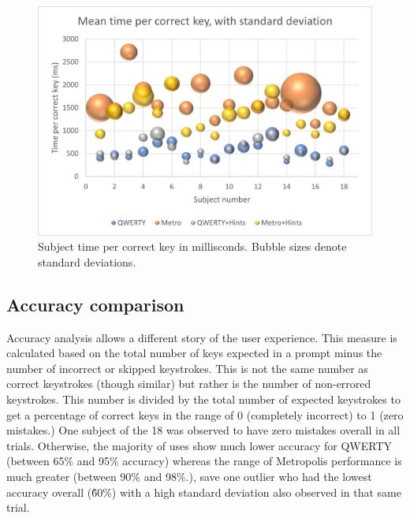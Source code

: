 \documentclass[english]{vgtc}
\begin{document}
\begin{figure}
  \centering
  \includegraphics[width=0.95\columnwidth]{time-per-key.png}
  \caption{Subject time per correct key in millisconds. Bubble sizes denote standard deviations.}
  \label{fig:keytime}
\end{figure}

\subsection{Accuracy comparison}

Accuracy analysis allows a different story of the user experience.  This measure is calculated based on the total number of keys expected in a prompt minus the number of incorrect or skipped keystrokes. This is not the same number as correct keystrokes (though similar) but rather is the number of non-errored keystrokes. This number is divided by the total number of expected keystrokes to get a percentage of correct keys in the range of 0 (completely incorrect) to 1 (zero mistakes.)  One subject of the 18 was observed to have zero mistakes overall in all trials.  Otherwise, the majority of uses show much lower accuracy for QWERTY (between 65\% and 95\% accuracy)
whereas the range of Metropolis performance is much greater (between 90\% and 98\%.), save one outlier who had the lowest accuracy overall (\~60\%) with a high standard deviation also observed in that same trial.
\end{document}
